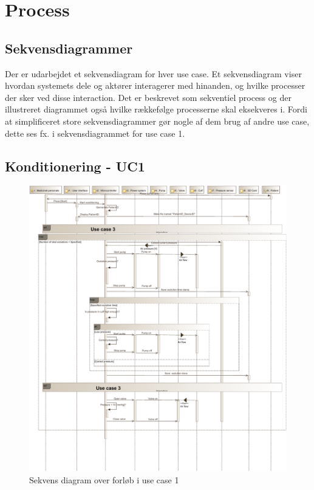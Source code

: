 \newpage
\section{Process}

\subsection{Sekvensdiagrammer}
Der er udarbejdet et sekvensdiagram for hver use case. Et sekvensdiagram viser hvordan systemets dele og aktører interagerer med hinanden, og hvilke processer der sker ved disse interaction. Det er beskrevet som sekventiel process og der illustreret diagrammet også hvilke rækkefølge processerne skal eksekveres i. 
Fordi at simplificeret store sekvensdiagrammer gør nogle af dem brug af andre use case, dette ses fx. i sekvensdiagrammet for use case 1. 

\subsection{Konditionering - UC1} \hfil
\begin{figure}[H]
	\includegraphics[width=\textwidth ]{pdfs/SD_UC1-crop.pdf}
	\caption{Sekvens diagram over forløb i use case 1}
\end{figure}
\newpage


